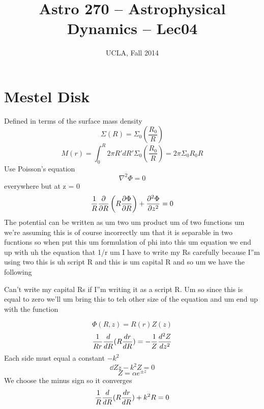 


\title{Astro 270 -- Astrophysical Dynamics -- Lec04}
\author{UCLA, Fall 2014}
\date{}


\setlength{\unitlength}{1mm}
\maketitle

\section{Mestel Disk}
Defined in terms of the surface mass density
\begin{equation}
\Sigma(R) = \Sigma_0 \left(\frac{R_0}{R}\right)
\end{equation}
\begin{equation}
M(r) = \int_0^R 2\pi R' dR' \Sigma_0 \left(\frac{R_0}{R}\right) = 2\pi \Sigma_0 R_0R
\end{equation}
Use Poisson's equation
\begin{equation} 
\nabla^2 \Phi = 0
\end{equation}
everywhere but at z = 0
\begin{equation}
\frac{1}{R} \frac{\partial }{\partial R} \left(R \frac{\partial \Phi}{\partial R}\right) + \frac{\partial^2 \Phi}{\partial z^2} = 0
\end{equation}
The potential can be written as um two um product um of two functions um we're assuming this is of course incorrectly um that it is separable in two fucntions so when put this um formulation of phi into this um equation we end up with uh the equation that 1/r um I have to write my Rs carefully because I''m using two this is uh script R and this is um capital R and so um we have the following 

Can't write my capital Rs if I''m writing it as a script R. Um so since this is equal to zero we'll um bring this to teh other size of the equation and um end up with the function 

\begin{equation}
\Phi (R,z) = R(r) Z(z)
\end{equation}
\begin{equation}
\frac{1}{Rr} \frac{d }{d R} (R \frac{d r}{d R}) = -\frac{1}{Z} \frac{d^2 Z}{d z^2}
\end{equation}
Each side must equal a constant $-k^2$
\begin{equation}
\dd{Z}{z} - k^2Z = 0
\end{equation}
\begin{equation}
Z = \alpha e^{\pm z}
\end{equation}
We choose the minus sign so it converges
\begin{equation}
\frac{1}{R} \frac{d }{d R} (R \frac{d r}{d R}) + k^2R=0
\end{equation}

